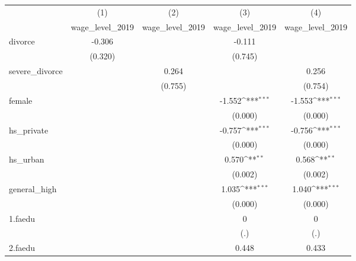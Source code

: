 {
\def\sym#1{\ifmmode^{#1}\else\(^{#1}\)\fi}
\begin{tabular}{l*{4}{c}}
\hline\hline
            &\multicolumn{1}{c}{(1)}&\multicolumn{1}{c}{(2)}&\multicolumn{1}{c}{(3)}&\multicolumn{1}{c}{(4)}\\
            &\multicolumn{1}{c}{wage\_level\_2019}&\multicolumn{1}{c}{wage\_level\_2019}&\multicolumn{1}{c}{wage\_level\_2019}&\multicolumn{1}{c}{wage\_level\_2019}\\
\hline
divorce     &      -0.306         &                     &      -0.111         &                     \\
            &     (0.320)         &                     &     (0.745)         &                     \\
[1em]
severe\_divorce&                     &       0.264         &                     &       0.256         \\
            &                     &     (0.755)         &                     &     (0.754)         \\
[1em]
female      &                     &                     &      -1.552\sym{***}&      -1.553\sym{***}\\
            &                     &                     &     (0.000)         &     (0.000)         \\
[1em]
hs\_private  &                     &                     &      -0.757\sym{***}&      -0.756\sym{***}\\
            &                     &                     &     (0.000)         &     (0.000)         \\
[1em]
hs\_urban    &                     &                     &       0.570\sym{**} &       0.568\sym{**} \\
            &                     &                     &     (0.002)         &     (0.002)         \\
[1em]
general\_high&                     &                     &       1.035\sym{***}&       1.040\sym{***}\\
            &                     &                     &     (0.000)         &     (0.000)         \\
[1em]
1.faedu     &                     &                     &           0         &           0         \\
            &                     &                     &         (.)         &         (.)         \\
[1em]
2.faedu     &                     &                     &       0.448         &       0.433         \\

\end{tabular}}
